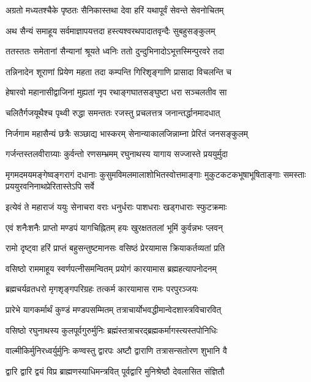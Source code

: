 \twolineshloka
{अग्रतो मध्यतश्चैके पृष्ठतः सैनिकास्तथा}
{देवा हरिं यथापूर्वं सेवन्ते सेवनोचितम्}%

\twolineshloka
{अथ सैन्यं समाहूय सर्वमाज्ञापयत्तदा}
{हस्त्यश्वरथपादातवृन्दैः सुबहुसङ्कुलम्}%

\twolineshloka
{ततस्ततः समेतानां सैन्यानां श्रूयते ध्वनिः}
{ततो दुन्दुभिनादोऽभूत्तस्मिन्पुरवरे तदा}%

\twolineshloka
{तन्निनादेन शूराणां प्रियेण महता तदा}
{कम्पन्ति गिरिशृङ्गाणि प्रासादा विचलन्ति च}%

\twolineshloka
{हेषारवो महानासीद्वाजिनां मुह्यतां नृप}
{रथाङ्गघातसङ्घुष्टा धरा सञ्चलतीव सा}%

\twolineshloka
{चलितैर्गजयूथैश्च पृथ्वी रुद्धा समन्ततः}
{रजस्तु प्रचलत्तत्र जनान्तर्द्धानमादधात्}%

\twolineshloka
{निर्जगाम महासैन्यं छत्रैः सञ्छाद्य भास्करम्}
{सेनान्याकालजिन्नाम्ना प्रेरितं जनसङ्कुलम्}%

\twolineshloka
{गर्जन्तस्तलवीराग्र्याः कुर्वन्तो रणसम्भ्रमम्}
{रघुनाथस्य यागाय सज्जास्ते प्रययुर्मुदा}%

\twolineshloka
{मृगमदमयमङ्गेष्वङ्गरागं दधानाः कुसुमविमलमालाशोभितस्वोत्तमाङ्गाः}
{मुकुटकटकभूषाभूषिताङ्गाः समस्ताः प्रययुरवनिनाथप्रेरितास्तेऽपि सर्वे}%

\twolineshloka
{इत्येवं ते महाराजं ययुः सेनाचरा वराः}
{धनुर्धराः पाशधराः खड्गधाराः स्फुटक्रमाः}%

\twolineshloka
{एवं शनैःशनैः प्राप्तो मण्डपं यागचिह्नितम्}
{हयः खुरक्षततलां भूमिं कुर्वन्नभः प्लवन्}%

\twolineshloka
{रामो दृष्ट्वा हरिं प्राप्तं बहुसन्तुष्टमानसः}
{वसिष्ठं प्रेरयामास क्रियाकर्तव्यतां प्रति}%

\twolineshloka
{वसिष्ठो राममाहूय स्वर्णपत्नीसमन्वितम्}
{प्रयोगं कारयामास ब्रह्महत्यापनोदनम्}%

\twolineshloka
{ब्रह्मचर्यव्रतधरो मृगशृङ्गपरिग्रहः}
{तत्कर्म कारयामास रामः परपुरञ्जयः}%

\twolineshloka
{प्रारेभे यागकर्मार्थं कुण्डं मण्डपसम्मितम्}
{तत्राचार्योभवद्धीमान्वेदशास्त्रविचारवित्}%

\twolineshloka
{वसिष्ठो रघुनाथस्य कुलपूर्वगुरुर्मुनिः}
{ब्रह्मंस्तत्राचरद्ब्रह्मकर्मागस्त्यस्तपोनिधिः}%

\twolineshloka
{वाल्मीकिर्मुनिरध्वर्युर्मुनिः कण्वस्तु द्वारपः}
{अष्टौ द्वाराणि तत्रासन्सतोरण शुभानि वै}%

\twolineshloka
{द्वारि द्वारि द्वयं विप्र ब्राह्मणस्याधिमन्त्रवित्}
{पूर्वद्वारि मुनिश्रेष्ठौ देवलासित संज्ञितौ}%

